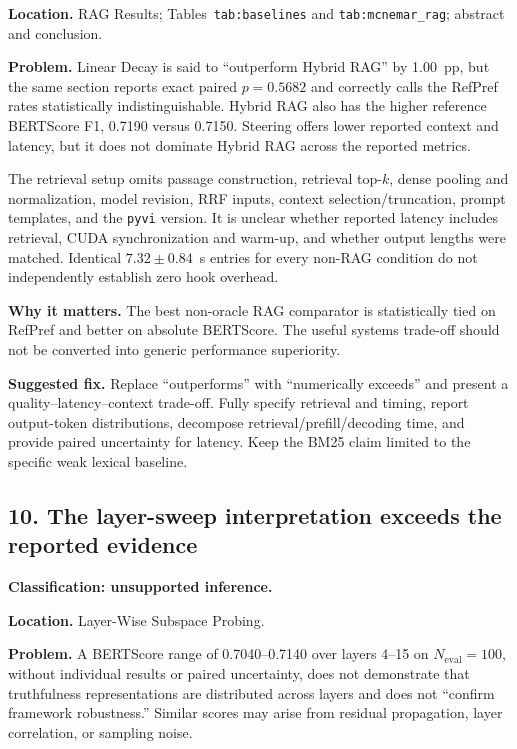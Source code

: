 \documentclass[11pt]{article}
\begin{document}
\textbf{Location.} RAG Results; Tables~\texttt{tab:baselines} and \texttt{tab:mcnemar\_rag}; abstract and conclusion.

\textbf{Problem.} Linear Decay is said to ``outperform Hybrid RAG'' by 1.00~pp, but the same section reports exact paired $p=0.5682$ and correctly calls the RefPref rates statistically indistinguishable.  Hybrid RAG also has the higher reference BERTScore F1, 0.7190 versus 0.7150.  Steering offers lower reported context and latency, but it does not dominate Hybrid RAG across the reported metrics.

The retrieval setup omits passage construction, retrieval top-$k$, dense pooling and normalization, model revision, RRF inputs, context selection/truncation, prompt templates, and the \texttt{pyvi} version.  It is unclear whether reported latency includes retrieval, CUDA synchronization and warm-up, and whether output lengths were matched.  Identical $7.32\pm0.84$~s entries for every non-RAG condition do not independently establish zero hook overhead.

\textbf{Why it matters.} The best non-oracle RAG comparator is statistically tied on RefPref and better on absolute BERTScore.  The useful systems trade-off should not be converted into generic performance superiority.

\textbf{Suggested fix.} Replace ``outperforms'' with ``numerically exceeds'' and present a quality--latency--context trade-off.  Fully specify retrieval and timing, report output-token distributions, decompose retrieval/prefill/decoding time, and provide paired uncertainty for latency.  Keep the BM25 claim limited to the specific weak lexical baseline.

\subsection*{10. The layer-sweep interpretation exceeds the reported evidence}

\textbf{Classification: unsupported inference.}

\textbf{Location.} Layer-Wise Subspace Probing.

\textbf{Problem.} A BERTScore range of 0.7040--0.7140 over layers 4--15 on $N_{\text{eval}}=100$, without individual results or paired uncertainty, does not demonstrate that truthfulness representations are distributed across layers and does not ``confirm framework robustness.''  Similar scores may arise from residual propagation, layer correlation, or sampling noise.
\end{document}
